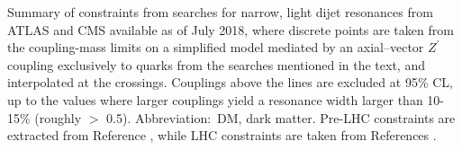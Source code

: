 
Summary of constraints from searches for narrow, light dijet
resonances from ATLAS and CMS available as of
July 2018, where discrete points are taken
from the coupling-mass limits on a simplified model mediated by an
axial--vector $Z^\prime$ coupling exclusively to quarks from the
searches mentioned in the text, and interpolated at the crossings.
Couplings above the lines are excluded at 95\% CL, up to the
values where larger couplings yield a resonance width larger than
10-15\% (roughly \gq $>$ 0.5). Abbreviation:\ DM, dark matter.
Pre-LHC constraints are extracted from Reference ,
while LHC constraints are taken from References \cite{Sirunyan:2017nvi,Aaboud:2018zba,
ATLAS:2016bvn,Sirunyan:2017nvi,Sirunyan:2018xlo,Aaboud:2018fzt,Aaboud:2017yvp}.

